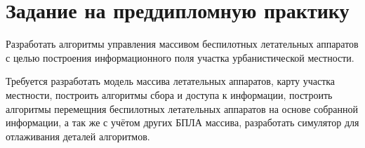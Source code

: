 \newpage
\section{Задание на преддипломную практику}

Разработать алгоритмы управления
массивом беспилотных летательных аппаратов
с целью построения информационного поля
участка урбанистической местности.

Требуется разработать модель массива летательных аппаратов,
карту участка местности, построить алгоритмы сбора и доступа
к информации, построить алгоритмы перемещния беспилотных
летательных аппаратов на основе собранной
информации, а так же с учётом других БПЛА массива,
разработать симулятор для отлаживания деталей алгоритмов.
